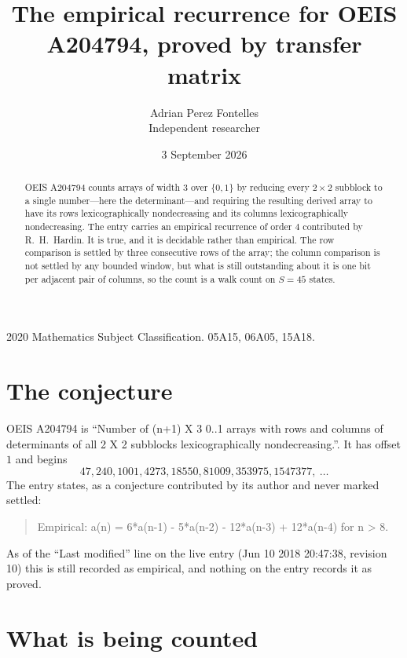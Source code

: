 \documentclass[11pt,a4paper]{article}
\title{The empirical recurrence for OEIS A204794, proved by transfer matrix}
\author{Adrian Perez Fontelles\\ \small Independent researcher}
\date{3 September 2026}
\theoremstyle{plain}
\theoremstyle{definition}
\begin{document}
\maketitle

\begin{abstract}
OEIS A204794 counts arrays of width $3$ over $\{0,1\}$ by reducing every $2\times2$ subblock to a
single number---here the determinant---and requiring the resulting derived array to have its rows
lexicographically nondecreasing and its columns lexicographically nondecreasing. The entry carries an
empirical recurrence of order $4$ contributed by R.~H.~Hardin. It is true, and it is
decidable rather than empirical. The row comparison is settled by three consecutive rows of the
array; the column comparison is not settled by any bounded window, but what is still outstanding
about it is one bit per adjacent pair of columns, so the count is a walk count on $S=45$
states.
\end{abstract}

\noindent\small 2020 Mathematics Subject Classification. 05A15, 06A05, 15A18.\normalsize

\section{The conjecture}

OEIS A204794 is ``Number of (n+1) X 3 0..1 arrays with rows and columns of determinants of all 2 X 2 subblocks lexicographically nondecreasing.''. It has offset $1$ and begins
\[
47, 240, 1001, 4273, 18550, 81009, 353975, 1547377,\ \dots
\]
The entry states, as a conjecture contributed by its author and never marked settled:
\begin{quote}
Empirical: a(n) = 6*a(n-1) - 5*a(n-2) - 12*a(n-3) + 12*a(n-4) for n > 8.
\end{quote}
As of the ``Last modified'' line on the live entry (Jun 10 2018 20:47:38, revision 10) this is still
recorded as empirical, and nothing on the entry records it as proved.

\section{What is being counted}
\end{document}
